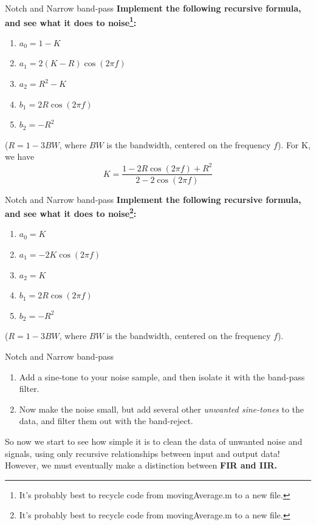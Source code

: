 \documentclass{beamer}
\begin{document}
\begin{frame}[fragile]{Notch and Narrow band-pass}
\small
\textbf{Implement the following recursive formula, and see what it does to noise\footnote{It's probably best to recycle code from movingAverage.m to a new file.}:}
\begin{enumerate}
\item $a_0 = 1-K$
\item $a_1 = 2(K-R)\cos(2\pi f)$
\item $a_2 = R^2-K$
\item $b_1 = 2R\cos(2\pi f)$
\item $b_2 = -R^2$
\end{enumerate}
($R = 1-3 BW$, where $BW$ is the bandwidth, centered on the frequency $f$).  For K, we have
\begin{equation}
K = \frac{1-2R\cos(2\pi f)+R^2}{2-2\cos(2\pi f)}
\end{equation}
\end{frame}

\begin{frame}[fragile]{Notch and Narrow band-pass}
\small
\textbf{Implement the following recursive formula, and see what it does to noise\footnote{It's probably best to recycle code from movingAverage.m to a new file.}:}
\begin{enumerate}
\item $a_0 = K$
\item $a_1 = -2K\cos(2\pi f)$
\item $a_2 = K$
\item $b_1 = 2R\cos(2\pi f)$
\item $b_2 = -R^2$
\end{enumerate}
($R = 1-3 BW$, where $BW$ is the bandwidth, centered on the frequency $f$).
\end{frame}

\begin{frame}[fragile]{Notch and Narrow band-pass}
\begin{enumerate}
\item Add a sine-tone to your noise sample, and then isolate it with the band-pass filter.
\item Now make the noise small, but add several other \textit{unwanted sine-tones} to the data, and filter them out with the band-reject.
\end{enumerate}
So now we start to see how simple it is to clean the data of unwanted noise and signals, using only recursive relationships between input and output data!  However, we must eventually make a distinction between \textbf{FIR and IIR.}
\end{frame}
\end{document}
